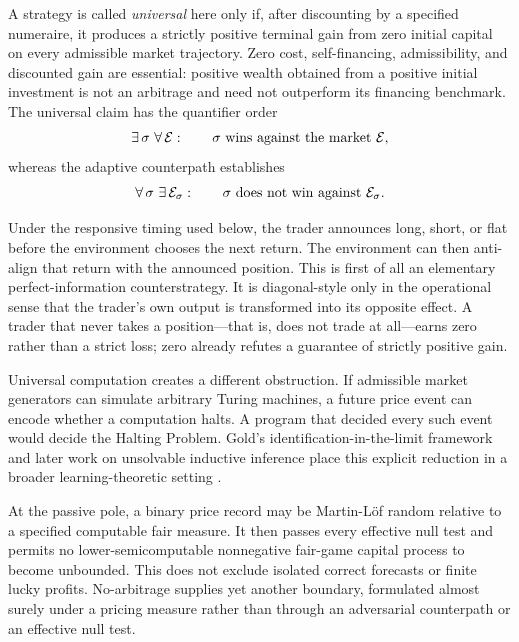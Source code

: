 \documentclass[aps,pra,reprint,superscriptaddress,amsmath,amssymb,floatfix]{revtex4-2}
\theoremstyle{plain}
\theoremstyle{definition}
\theoremstyle{remark}
\begin{document}
A strategy is called \emph{universal} here only if, after discounting by a
specified numeraire, it produces a strictly positive terminal gain from zero
initial capital on every admissible market trajectory. Zero cost,
self-financing, admissibility, and discounted gain are essential: positive
wealth obtained from a positive initial investment is not an arbitrage and
need not outperform its financing benchmark. The universal claim has the
quantifier order
\begin{equation}
  \exists\,\sigma\ \forall\,\mathcal E:
  \qquad \sigma\ \hbox{wins against the market }\mathcal E ,
  \label{eq:universalquantifiers}
\end{equation}
whereas the adaptive counterpath establishes
\begin{equation}
  \forall\,\sigma\ \exists\,\mathcal E_\sigma:
  \qquad \sigma\ \hbox{does not win against }\mathcal E_\sigma .
  \label{eq:counterquantifiers}
\end{equation}

Under the responsive timing used below, the trader announces long, short, or
flat before the environment chooses the next return. The environment can then
anti-align that return with the announced position. This is first of all an
elementary perfect-information counterstrategy. It is diagonal-style only in
the operational sense that the trader's own output is transformed into its
opposite effect. A trader that never takes a position---that is, does not trade
at all---earns zero rather than a strict loss; zero already refutes a guarantee
of strictly positive gain.

Universal computation creates a different obstruction. If admissible market
generators can simulate arbitrary Turing machines, a future price event can
encode whether a computation halts. A program that decided every such event
would decide the Halting Problem. Gold's identification-in-the-limit framework
and later work on unsolvable inductive inference place this explicit reduction
in a broader learning-theoretic setting
\cite{go-67,ad-91,angluin:83,2016-AlexanderKarlSvozil-ml,moore}.

At the passive pole, a binary price record may be Martin-L\"of random relative
to a specified computable fair measure. It then passes every effective null
test and permits no lower-semicomputable nonnegative fair-game capital process
to become unbounded. This does not exclude isolated correct forecasts or
finite lucky profits. No-arbitrage supplies yet another boundary, formulated
almost surely under a pricing measure rather than through an adversarial
counterpath or an effective null test.
\end{document}
